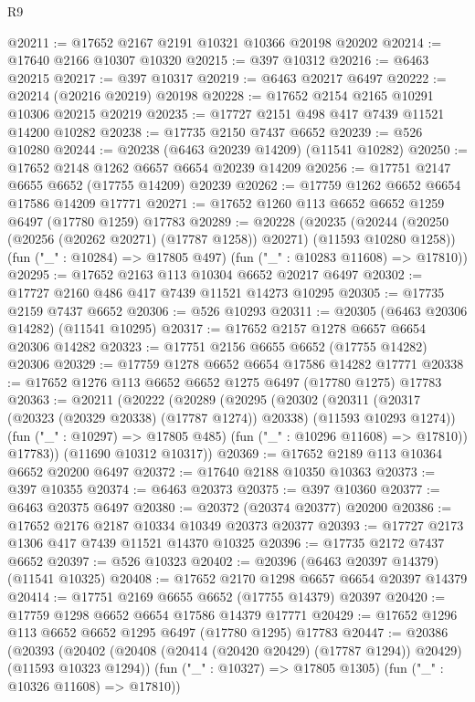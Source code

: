 \begin{lexlean}{R9}
\begin{coremodule}
{{{{{{{{{{{{{{{{{{{{{{{{{{{{{{{{{{{{{{{{{{{{{{{{{{{{{{{{{{{{{{{{{{{{{{{{{{{{{{{{{{{{@20211 := @17652 @2167 @2191 @10321 @10366 @20198 @20202
@20214 := @17640 @2166 @10307 @10320
@20215 := @397 @10312
@20216 := @6463 @20215
@20217 := @397 @10317
@20219 := @6463 @20217 @6497
@20222 := @20214 (@20216 @20219) @20198
@20228 := @17652 @2154 @2165 @10291 @10306 @20215 @20219
@20235 := @17727 @2151 @498 @417 @7439 @11521 @14200 @10282
@20238 := @17735 @2150 @7437 @6652
@20239 := @526 @10280
@20244 := @20238 (@6463 @20239 @14209) (@11541 @10282)
@20250 := @17652 @2148 @1262 @6657 @6654 @20239 @14209
@20256 := @17751 @2147 @6655 @6652 (@17755 @14209) @20239
@20262 := @17759 @1262 @6652 @6654 @17586 @14209 @17771
@20271 := @17652 @1260 @113 @6652 @6652 @1259 @6497 (@17780 @1259) @17783
@20289 := @20228
    (@20235
      (@20244 (@20250 (@20256 (@20262 @20271) (@17787 @1258)) @20271) (@11593 @10280 @1258))
      (fun ("_" : @10284) => @17805 @497)
      (fun ("_" : @10283 @11608) => @17810))
@20295 := @17652 @2163 @113 @10304 @6652 @20217 @6497
@20302 := @17727 @2160 @486 @417 @7439 @11521 @14273 @10295
@20305 := @17735 @2159 @7437 @6652
@20306 := @526 @10293
@20311 := @20305 (@6463 @20306 @14282) (@11541 @10295)
@20317 := @17652 @2157 @1278 @6657 @6654 @20306 @14282
@20323 := @17751 @2156 @6655 @6652 (@17755 @14282) @20306
@20329 := @17759 @1278 @6652 @6654 @17586 @14282 @17771
@20338 := @17652 @1276 @113 @6652 @6652 @1275 @6497 (@17780 @1275) @17783
@20363 := @20211
    (@20222
      (@20289
        (@20295
          (@20302
            (@20311 (@20317 (@20323 (@20329 @20338) (@17787 @1274)) @20338) (@11593 @10293 @1274))
            (fun ("_" : @10297) => @17805 @485)
            (fun ("_" : @10296 @11608) => @17810))
          @17783))
      (@11690 @10312 @10317))
@20369 := @17652 @2189 @113 @10364 @6652 @20200 @6497
@20372 := @17640 @2188 @10350 @10363
@20373 := @397 @10355
@20374 := @6463 @20373
@20375 := @397 @10360
@20377 := @6463 @20375 @6497
@20380 := @20372 (@20374 @20377) @20200
@20386 := @17652 @2176 @2187 @10334 @10349 @20373 @20377
@20393 := @17727 @2173 @1306 @417 @7439 @11521 @14370 @10325
@20396 := @17735 @2172 @7437 @6652
@20397 := @526 @10323
@20402 := @20396 (@6463 @20397 @14379) (@11541 @10325)
@20408 := @17652 @2170 @1298 @6657 @6654 @20397 @14379
@20414 := @17751 @2169 @6655 @6652 (@17755 @14379) @20397
@20420 := @17759 @1298 @6652 @6654 @17586 @14379 @17771
@20429 := @17652 @1296 @113 @6652 @6652 @1295 @6497 (@17780 @1295) @17783
@20447 := @20386
    (@20393
      (@20402 (@20408 (@20414 (@20420 @20429) (@17787 @1294)) @20429) (@11593 @10323 @1294))
      (fun ("_" : @10327) => @17805 @1305)
      (fun ("_" : @10326 @11608) => @17810))
}}}}}}}}}}}}}}}}}}}}}}}}}}}}}}}}}}}}}}}}}}}}}}}}}}}}}}}}}}}}}}}}}}}}}}}}}}}}}}}}}}}}
\end{coremodule}
\end{lexlean}
